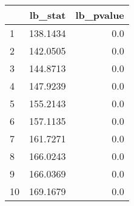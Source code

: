 \begin{tabular}{lrr}
\toprule
{} &   lb\_stat &  lb\_pvalue \\
\midrule
1  &  138.1434 &        0.0 \\
2  &  142.0505 &        0.0 \\
3  &  144.8713 &        0.0 \\
4  &  147.9239 &        0.0 \\
5  &  155.2143 &        0.0 \\
6  &  157.1135 &        0.0 \\
7  &  161.7271 &        0.0 \\
8  &  166.0243 &        0.0 \\
9  &  166.0369 &        0.0 \\
10 &  169.1679 &        0.0 \\
\bottomrule
\end{tabular}
